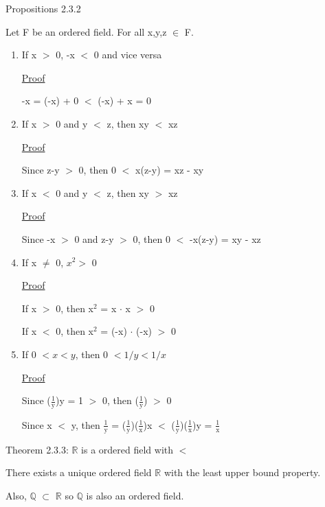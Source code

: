 { \color{blue} Propositions 2.3.2} 

	\qquad Let F be an ordered field. For all x,y,z $\in$ F.
	\begin{enumerate}[label=(\alph*), leftmargin=2cm, itemsep=0.4em]
		\item If x $>$ 0, -x $<$ 0 and vice versa
	
			{ \color{magenta} \underline{Proof} } 
	
				-x = (-x) + 0 $<$ (-x) + x = 0

		\item If x $>$ 0 and y $<$ z, then xy $<$ xz
	
			{ \color{magenta} \underline{Proof} } 
		
				Since z-y $>$ 0, then 0 $<$ x(z-y) = xz - xy

		\item If x $ < $ 0 and y $ < $ z, then xy $ > $ xz

			{ \color{magenta} \underline{Proof} } 
		
				Since -x $>$ 0 and z-y $>$ 0, then 0 $<$ -x(z-y) = xy - xz
	
		\item If x $\neq$ 0, $x^2 > $ 0

			{ \color{magenta} \underline{Proof} } 
		
				If x $>$ 0, then x$^\text{2}$ = x $\cdot$ x $>$ 0

				If x $<$ 0, then x$^\text{2}$ = (-x) $\cdot$ (-x) $>$ 0
	
		\item If 0 $< x < y$, then 0 $< 1/y < 1/x$

			{ \color{magenta} \underline{Proof} } 
		
				Since ($\frac{1}{\text{y}}$)y = 1 $>$ 0, then ($\frac{1}{\text{y}}$) $>$ 0

				Since x $<$ y, then $\frac{1}{\text{y}}$
				= ($\frac{1}{\text{y}}$)($\frac{1}{\text{x}}$)x
				$<$ ($\frac{1}{\text{y}}$)($\frac{1}{\text{x}}$)y = $\frac{1}{\text{x}}$ \\
	\end{enumerate}

{\color{red} Theorem 2.3.3: $\mathbb{R}$ is a ordered field with $<$ }

	\qquad There exists a unique ordered field $ \mathbb{R} $ with the least upper bound property.

	\qquad Also, $ \mathbb{Q} $  $\subset$ $ \mathbb{R} $ so $\mathbb{Q}$ is also an ordered field. \\

